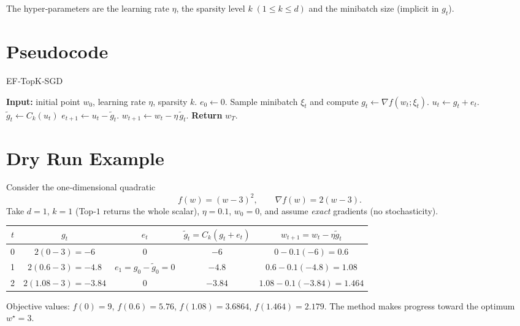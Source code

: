 \documentclass{article}
\begin{document}
The hyper‑parameters are the learning rate $\eta$, the sparsity level $k\;(1\le k\le d)$ and the minibatch size (implicit in $g_t$).

\section*{Pseudocode}
\begin{algorithm}[H]
\caption{EF‑TopK‑SGD}
\begin{algorithmic}[1]
\STATE \textbf{Input:} initial point $w_0$, learning rate $\eta$, sparsity $k$.
\STATE $e_0\gets 0$.
    \STATE Sample minibatch $\xi_t$ and compute $g_t\gets\nabla f(w_t;\xi_t)$.
    \STATE $u_t\gets g_t+e_t$.
    \STATE $\tilde g_t\gets C_k(u_t)$ \hfill{}
    \STATE $e_{t+1}\gets u_t-\tilde g_t$.
    \STATE $w_{t+1}\gets w_t-\eta\,\tilde g_t$.
\ENDFOR
\STATE \textbf{Return} $w_T$.
\end{algorithmic}
\end{algorithm}

\section*{Dry Run Example}
Consider the one‑dimensional quadratic 
\[
f(w)=(w-3)^2,\qquad \nabla f(w)=2(w-3).
\]
Take $d=1$, $k=1$ (Top‑$1$ returns the whole scalar), $\eta=0.1$, $w_0=0$, and assume \emph{exact} gradients (no stochasticity).  

\begin{center}
\begin{tabular}{c|c|c|c|c}
$t$ & $g_t$ & $e_t$ & $\tilde g_t=C_k(g_t+e_t)$ & $w_{t+1}=w_t-\eta\tilde g_t$\\ \hline
0 & $2(0-3)=-6$ & $0$ & $-6$ & $0-0.1(-6)=0.6$\\
1 & $2(0.6-3)=-4.8$ & $e_1=g_0-\tilde g_0=0$ & $-4.8$ & $0.6-0.1(-4.8)=1.08$\\
2 & $2(1.08-3)=-3.84$ & $0$ & $-3.84$ & $1.08-0.1(-3.84)=1.464$\\
\end{tabular}
\end{center}

Objective values: $f(0)=9$, $f(0.6)=5.76$, $f(1.08)=3.6864$, $f(1.464)=2.179$. The method makes progress toward the optimum $w^\star=3$.

\newpage
\end{document}

